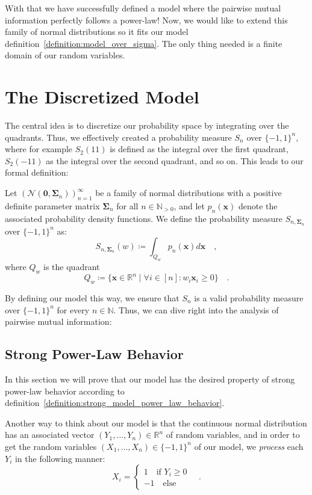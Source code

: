 \documentclass[../../main.tex]{subfiles}
\begin{document}
\bigskip
With that we have successfully defined a model where the pairwise mutual information perfectly follows a power-law! Now, we would like to extend this family of normal distributions so it fits our model definition~\ref{definition:model_over_sigma}. The only thing needed is a finite domain of our random variables.

\section{The Discretized Model}
The central idea is to discretize our probability space by integrating over the quadrants. Thus, we effectively created a probability measure $S_n$ over $\{-1, 1\}^n$, where for example $S_2(11)$ is defined as the integral over the first quadrant, $S_2(-11)$ as the integral over the second quadrant, and so on. This leads to our formal definition:

\begin{definition}
    \label{definition:the_model}
    Let $\left(\mathcal{N}(\bm{0}, \bm{\Sigma}_n)\right)_{n=1}^\infty$ be a family of normal distributions with a positive definite parameter matrix $\bm{\Sigma}_n$ for all $n \in \mathbb{N}_{>0}$, and let $p_n(\bm{x})$ denote the associated probability density functions. We define the probability measure $S_{n, \bm{\Sigma}_n}$ over $\{-1, 1\}^n$ as:
    \[
        S_{n, \bm{\Sigma}_n}(w) \coloneqq \int_{Q_w} p_n(\bm{x}) d\bm{x} \quad ,
    \]
    where $Q_w$ is the quadrant
    \[
        Q_w \coloneqq \{ \bm{x} \in \mathbb{R}^n \mid \forall i \in [n] : w_i \bm{x}_i \geq 0 \} \quad .
    \]
\end{definition}

By defining our model this way, we ensure that $S_n$ is a valid probability measure over $\{-1, 1\}^n$ for every $n \in \mathbb{N}$. Thus, we can dive right into the analysis of pairwise mutual information:

\subsection{Strong Power-Law Behavior}
In this section we will prove that our model has the desired property of strong power-law behavior according to definition~\ref{definition:strong_model_power_law_behavior}.

Another way to think about our model is that the continuous normal distribution has an associated vector $(Y_1, \dots, Y_n) \in \mathbb{R}^n$ of random variables, and in order to get the random variables $(X_1, \dots, X_n) \in \{-1, 1\}^n$ of our model, we \emph{process} each $Y_i$ in the following manner:
\[
    X_i = \begin{cases}
        1 \quad \text{if } Y_i \geq 0 \\
        -1 \quad \text{else}
    \end{cases}
    \quad .
\]
\end{document}
